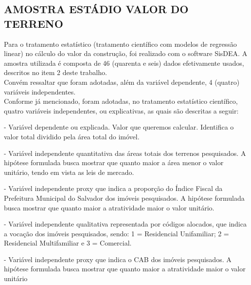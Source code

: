 \subsection{AMOSTRA ESTÁDIO VALOR DO TERRENO}
%
\hspace*{1.25 cm} Para o tratamento estatístico (tratamento científico com modelos de regressão linear) no cálculo do valor da construção, foi realizado com o software SisDEA. A amostra utilizada é composta de 46 (quarenta e seis) dados efetivamente usados, descritos no item 2 deste trabalho.\\ 
%
\hspace*{1.25 cm}  Convém ressaltar que foram adotadas, além da variável dependente, 4 (quatro) variáveis independentes.\\ 
%
\hspace*{1.25 cm}  Conforme já mencionado, foram adotadas, no tratamento estatístico científico, quatro variáveis independentes, ou explicativas, as quais são descritas a seguir:
%
\begin{description}[itemsep=1pt,parsep=1pt]\vspace{0.00mm} 
	\item[\textbf{Valor / m2}]   - Variável dependente ou explicada. Valor que queremos calcular. Identifica o valor total dividido pela área total do imóvel.
	
	\item[\textbf{Área total}]   - Variável independente quantitativa das áreas totais dos terrenos pesquisados. A hipótese formulada busca mostrar que quanto maior a área menor o valor unitário, tendo em vista as leis de mercado.
	
	\item[\textbf{Indice fiscal (PMS)}]   - Variável independente proxy que indica a proporção do Índice Fiscal da Prefeitura Municipal do Salvador dos imóveis pesquisados. A hipótese formulada busca mostrar que quanto maior a atratividade maior o valor unitário.
	
	\item[\textbf{Vocação} ]  - Variável independente qualitativa representada por códigos alocados, que indica a vocação dos imóveis pesquisados, sendo: 1 = Residencial Unifamiliar; 2 = Residencial Multifamiliar e 3 = Comercial.
	
	\item[\textbf{CAB PDDU}]   - Variável independente proxy que indica o CAB dos imóveis pesquisados. A hipótese formulada busca mostrar que quanto maior a atratividade maior o valor unitário
\end{description}


